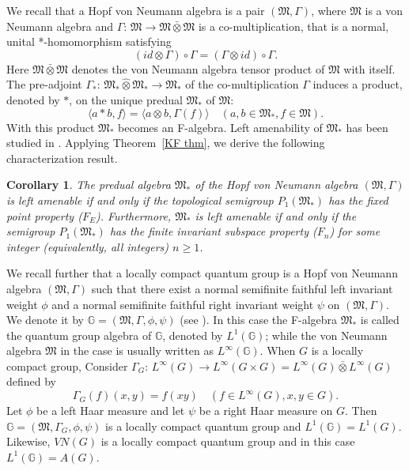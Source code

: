 \documentclass{tran-l}
\numberwithin{equation}{section}
\newtheorem{cor}[thm]{Corollary}
\theoremstyle{definition}
\theoremstyle{remark}
\begin{document}
We recall that a Hopf von Neumann algebra is a pair $({\mathfrak{M}}, \Gamma)$, where ${\mathfrak{M}}$ is a von Neumann algebra and $\Gamma$: ${\mathfrak{M}} \to {\mathfrak{M}}\bar\otimes {\mathfrak{M}}$ is a co-multiplication, that is a normal, unital *-homomorphism satisfying
\[ (id\otimes \Gamma)\circ \Gamma =  (\Gamma\otimes id)\circ \Gamma.
\]
Here ${\mathfrak{M}}\bar\otimes {\mathfrak{M}}$ denotes the von Neumann algebra tensor product of ${\mathfrak{M}}$ with itself. The pre-adjoint $\Gamma_*$: ${\mathfrak{M}}_*{\hat{\otimes}} {\mathfrak{M}}_* \to {\mathfrak{M}}_*$  of the co-multiplication $\Gamma$ induces a product, denoted by $*$, on the unique predual ${\mathfrak{M}}_*$ of ${\mathfrak{M}}$:
\[
{\langle} a*b, f{\rangle} = {\langle} a\otimes b, \Gamma(f){\rangle} \quad (a,b\in {\mathfrak{M}}_*, f\in {\mathfrak{M}}).
\]
With this product ${\mathfrak{M}}_*$ becomes an F-algebra. Left amenability of ${\mathfrak{M}}_*$ has been studied in \cite{Ruan, Voic}. Applying Theorem~\ref{KF thm}, we derive the following characterization result.

\begin{cor}\label{Hopf}
The predual algebra ${\mathfrak{M}}_*$ of the Hopf von Neumann algebra $({\mathfrak{M}}, \Gamma)$ is left amenable if and only if the topological semigroup $P_1({\mathfrak{M}}_*)$ has the fixed point property ($F_E$). Furthermore, ${\mathfrak{M}}_*$ is left amenable if and only if the semigroup $P_1({\mathfrak{M}}_*)$ has the finite invariant subspace property ($F_n$) for some integer (equivalently, all integers) $n\geq 1$.
\end{cor}

We recall further that a locally compact quantum group is a Hopf von Neumann algebra $({\mathfrak{M}}, \Gamma)$ such that there exist a normal semifinite faithful left invariant weight $\phi$ and a  normal semifinite faithful right invariant weight $\psi$ on $({\mathfrak{M}}, \Gamma)$. We denote it by ${\mathbb G} = ({\mathfrak{M}}, \Gamma, \phi, \psi)$ (see \cite{K-V}). In this case the F-algebra ${\mathfrak{M}}_*$ is called the quantum group algebra of ${\mathbb G}$, denoted by $L^1({\mathbb G})$; while the von Neumann algebra ${\mathfrak{M}}$ in the case is usually written as $L^\infty({\mathbb G})$. When $G$ is a locally compact group, Consider $\Gamma_G$: $L^\infty(G)\to L^\infty(G\times G) = L^\infty(G)\bar\otimes L^\infty(G)$ defined by 
\[
\Gamma_G(f)(x,y) = f(xy) \quad (f\in L^\infty(G), x,y\in G).
\]
Let $\phi$ be a left Haar measure and let $\psi$ be a right Haar measure on $G$. Then ${\mathbb G} = ({\mathfrak{M}}, \Gamma_G, \phi, \psi)$ is a locally compact quantum group and $L^1({\mathbb G}) = L^1(G)$. Likewise, $VN(G)$ is a locally compact quantum group and in this case $L^1({\mathbb G}) = A(G)$.
\end{document}
